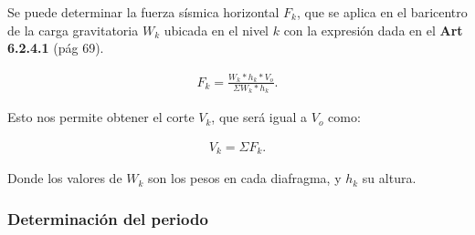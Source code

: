 \documentclass[../main.tex]{subfiles}
\begin{document}
Se puede determinar la fuerza sísmica horizontal $F_k$, que se aplica en el
baricentro de la carga gravitatoria $W_k$ ubicada en el nivel $k$ con la
expresión dada en el  \textbf{Art 6.2.4.1} (pág 69).

\begin{align*}
  F_k = \frac{W_k * h_k * V_o}{\Sigma W_k * h_k}
.\end{align*}

Esto nos permite obtener el corte $V_k$, que será igual a $V_o$ como:

\begin{align*}
  V_k = \Sigma F_k
.\end{align*}

Donde los valores de $W_k$ son los pesos en cada diafragma, y $h_k$ su altura.

\subsubsection{Determinación del periodo}\label{periodo}


\end{document}
